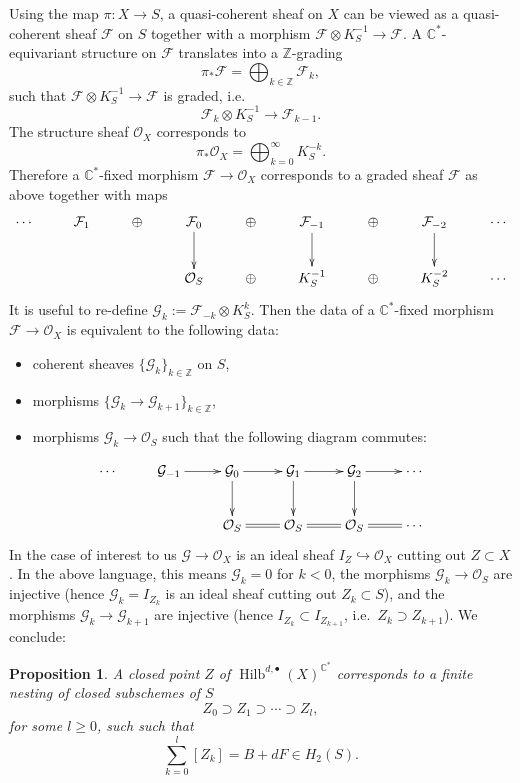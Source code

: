 \documentclass{amsart}
\newtheorem{proposition}[theorem]{Proposition}
\theoremstyle{definition}
\newcommand{\CC} {\mathbb{C}}          %
\newcommand{\ZZ} {\mathbb{Z}}		%
\renewcommand{\O}{\mathcal{O}}
\newcommand{\Hilb}{\operatorname{Hilb}}
\newcommand{\F}{\mathcal{F}}
\newcommand{\G}{\mathcal{G}}
\begin{document}
Using the map $\pi : X \rightarrow S$, a quasi-coherent sheaf on $X$ can be viewed as a quasi-coherent sheaf $\F$ on $S$ together with a morphism $\F \otimes K_{S}^{-1} \rightarrow \F$. A $\CC^*$-equivariant structure on $\F$ translates into a $\ZZ$-grading
$$
\pi_* \F = \bigoplus_{k \in \ZZ} \F_k,
$$
such that $\F \otimes K_{S}^{-1} \rightarrow \F$ is graded, i.e.
$$
\F_k \otimes K_{S}^{-1} \longrightarrow \F_{k-1}.
$$
The structure sheaf $\O_X$ corresponds to 
$$
\pi_* \O_X = \bigoplus_{k=0}^{\infty} K_{S}^{-k}.
$$
Therefore a $\CC^*$-fixed morphism $\F \rightarrow \O_X$ corresponds to a graded sheaf $\F$ as above together with maps
\begin{displaymath}
\xymatrix
{
\cdots & \F_1 & \oplus & \F_0 \ar[d] & \oplus & \F_{-1} \ar[d] & \oplus & \F_{-2} \ar[d] & \cdots \\
& & & \O_S & \oplus & K_{S}^{-1} & \oplus & K_{S}^{-2} & \cdots 
}
\end{displaymath}
It is useful to re-define $\G_k := \F_{-k} \otimes K_{S}^{k}$. Then the data of a $\CC^*$-fixed morphism $\F \rightarrow \O_X$ is equivalent to the following data:
\begin{itemize}
\item coherent sheaves $\{\G_k\}_{k \in \ZZ}$ on $S$,
\item morphisms $\{\G_k \rightarrow \G_{k+1}\}_{k \in \ZZ}$,
\item morphisms $\G_k \rightarrow \O_S$ such that the following diagram commutes:
\end{itemize}
\begin{displaymath}
\xymatrix
{
\cdots & \G_{-1} \ar[r] & \G_0 \ar[r] \ar[d] & \G_{1} \ar[r] \ar[d] & \G_{2} \ar[r] \ar[d] & \cdots \\
& & \O_S \ar@{=}[r]& \O_S \ar@{=}[r] & \O_S \ar@{=}[r] & \cdots 
}
\end{displaymath}
In the case of interest to us $\G \rightarrow \O_X$ is an ideal sheaf $I_Z \hookrightarrow \O_X$ cutting out $Z \subset X$. In the above language, this means $\G_k = 0$ for $k<0$, the morphisms $\G_k \rightarrow \O_S$ are injective (hence $\G_k = I_{Z_k}$ is an ideal sheaf cutting out $Z_k \subset S$), and the morphisms $\G_k \rightarrow \G_{k+1}$ are injective (hence $I_{Z_k} \subset I_{Z_{k+1}}$, i.e.~$Z_{k} \supset Z_{k+1}$). We conclude:
\begin{proposition}
A closed point $Z$ of $\Hilb^{d,\bullet}(X)^{\CC^*}$ corresponds to a finite nesting of closed subschemes of $S$
$$
Z_{0} \supset Z_{1} \supset \cdots \supset Z_{l},
$$
for some $l \geq 0$, such such that
$$
\sum_{k=0}^{l} [Z_k] = B + dF \in H_2(S).
$$
\end{proposition}
\end{document}
